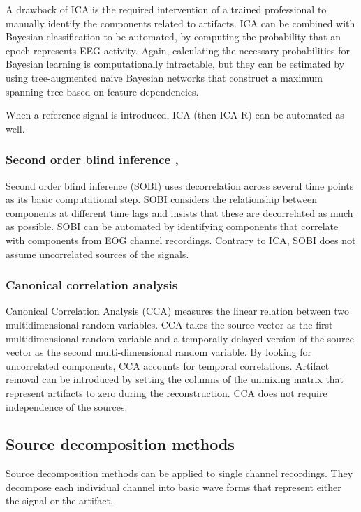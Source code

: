 \documentclass[twoside]{article}
\begin{document}
A drawback of ICA is the required intervention of a trained professional to manually identify the components related to artifacts. ICA can be combined with Bayesian classification to be automated, by computing the probability that an epoch represents EEG activity. Again, calculating the necessary probabilities for Bayesian learning is computationally intractable, but they can be estimated by using tree-augmented naive Bayesian networks that construct a maximum spanning tree based on feature dependencies.

When a reference signal is introduced, ICA (then ICA-R) can be automated as well. 


\subsubsection{Second order blind inference  \cite{SOBI}, \cite{SOBIautomated} \cite{SOBIreview}}
Second order blind inference (SOBI) uses decorrelation across several time points as its basic computational step. SOBI considers the relationship between components at different time lags and insists that these are decorrelated as much as possible. SOBI can be automated by identifying components that correlate with components from EOG channel recordings. Contrary to ICA, SOBI does not assume uncorrelated sources of the signals. 



\subsubsection{Canonical correlation analysis \cite{eegguidelines} \cite{ieee} \cite{cca}}
Canonical Correlation Analysis (CCA) measures the linear relation between two multidimensional random variables. CCA takes the source vector as the first multidimensional random variable and a temporally delayed version of the source vector as the second multi-dimensional random variable. By looking for uncorrelated components, CCA accounts for temporal correlations. Artifact removal can be introduced by setting the columns of the unmixing matrix that represent artifacts to zero during the reconstruction. CCA does not require independence of the sources. 



\subsection{Source decomposition methods}
Source decomposition methods can be applied to single channel recordings. They decompose each individual channel into basic wave forms that represent either the signal or the artifact. 
\end{document}
